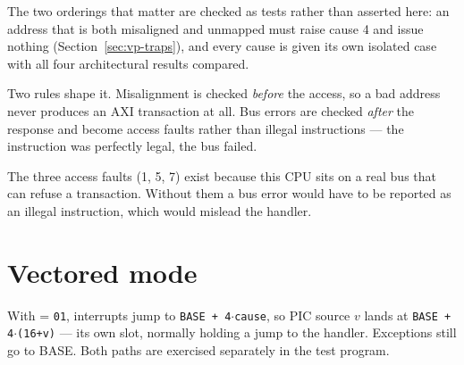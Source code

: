 The two orderings that matter are checked as tests rather than asserted here:
an address that is both misaligned and unmapped must raise cause 4 and issue
nothing (Section~\ref{sec:vp-traps}), and every cause is given its own isolated
case with all four architectural results compared.

Two rules shape it. Misalignment is checked \emph{before} the access, so a bad
address never produces an AXI transaction at all. Bus errors are checked
\emph{after} the response and become access faults rather than illegal
instructions --- the instruction was perfectly legal, the bus failed.

The three access faults (1, 5, 7) exist because this CPU sits on a real bus that
can refuse a transaction. Without them a bus error would have to be reported as
an illegal instruction, which would mislead the handler.

\section{Vectored mode}

With  = \texttt{01}, interrupts jump to
\texttt{BASE + 4$\cdot$cause}, so PIC source $v$ lands at
\texttt{BASE + 4$\cdot$(16+v)} --- its own slot, normally holding a jump to the
handler. Exceptions still go to BASE. Both paths are exercised separately in the
test program.
